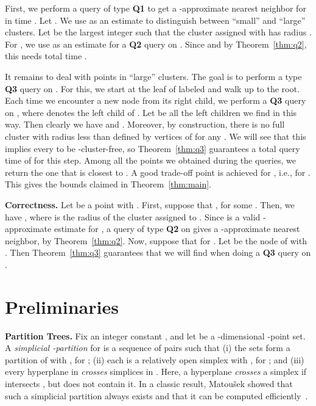 \documentclass[a4paper,11pt]{paper}
\begin{document}
First, we perform a query of type \textbf{Q1}
to get a -approximate nearest neighbor  for  in time
. Let .
We use  as an estimate to distinguish between
``small'' and
``large'' clusters. Let 
be the largest integer such that the cluster assigned with 
has radius .
For ,
we use  as an estimate for a \textbf{Q2} query
on . Since
 and by Theorem~\ref{thm:q2},
this needs
total time
.

It remains to deal with points in ``large'' clusters.
The goal is to perform a type \textbf{Q3}
query on . For this, we start at the
leaf of  labeled  and walk up to the root.
Each time we encounter a new node  from its right child,
we perform a \textbf{Q3} query on , where  denotes the
left child of .
Let  be all the left children we find in this way. Then clearly
we have   and
.
Moreover, by construction, there is no full cluster with radius
less than
 defined by  vertices of 
for any .
We will see that this implies every  to be
-cluster-free, so
Theorem~\ref{thm:q3} guarantees a total query
time of  for this step.
Among all the points we obtained during the queries,
we return the one that is closest to .
A good trade-off point is achieved for ,
i.e., for .
This gives the bounds claimed in Theorem~\ref{thm:main}.

\noindent
\textbf{Correctness.}
Let  be a point with .
First, suppose that ,
for some . Then, we have
, where 
is the radius of the cluster assigned to .
Since  is a valid -approximate
estimate for ,
a query of type \textbf{Q2} on  gives a -approximate nearest
neighbor, by Theorem~\ref{thm:q2}.
Now, suppose that  for .
Let  be the node of 
with . Then Theorem~\ref{thm:q3} guarantees
that we will find
 when doing a \textbf{Q3} query on .

\section{Preliminaries}
\label{sec:preliminaries}

\noindent
\textbf{Partition Trees.}
Fix an integer constant , and
let  be a -dimensional -point set.
A \emph{simplicial -partition}  for  is a sequence
 of pairs
such that (i) the sets  form a partition of
 with , for
;
(ii) each  is a relatively open simplex with
, for ; and
(iii) every hyperplane  in  \emph{crosses} 
  simplices  in . Here, a hyperplane  \emph{crosses}
  a simplex  if  intersects , but does not
  contain it.
In a classic result, Matou\v{s}ek showed that such a simplicial
partition always exists and that it can be computed
efficiently~\cite{Matousek92,Chazelle00}.
\end{document}
